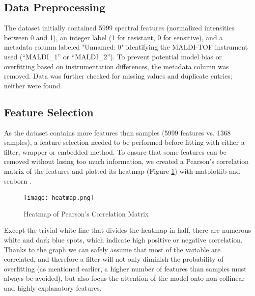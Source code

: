 \documentclass{article}
\begin{document}
\subsection{Data Preprocessing}
The dataset initially contained 5999 spectral features (normalized intensities between 0 and 1), an integer label (1 for resistant, 0 for sensitive), and a metadata column labeled "Unnamed: 0" identifying the MALDI-TOF instrument used (“MALDI\_1” or “MALDI\_2”). To prevent potential model bias or overfitting based on instrumentation differences, the metadata column was removed. Data was further checked for missing values and duplicate entries; neither were found.

\subsection{Feature Selection}
As the dataset contains more features than samples (5999 features vs. 1368 samples), a feature
selection needed to be performed before fitting with either a filter, wrapper or embedded method. To ensure
that some features can be removed without losing too much information, we created a Pearson’s correlation matrix of the features and plotted its heatmap (Figure \ref{fig:Heatmap of Pearson's correlation matrix}) with matplotlib \citep{matplotlib} and seaborn \citep{seaborn}.\\

\begin{figure}
	\centering
	\texttt{[image: heatmap.png]}
	 \vspace{-3em}
	\caption{Heatmap of Pearson's Correlation Matrix}
    \label{fig:Heatmap of Pearson's correlation matrix}
\end{figure}

Except the trivial white line that divides the heatmap in half, there are numerous white and dark blue spots, which indicate high positive or negative correlation. Thanks to the graph we can safely assume that most of the variable are correlated, and therefore a filter will not only diminish the probability of overfitting (as mentioned earlier, a higher number of features than samples must always be avoided), but also focus the attention of the model onto non-collinear and highly explanatory features. 
\end{document}
